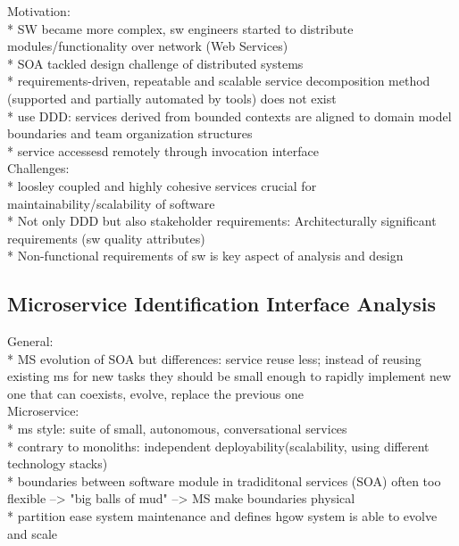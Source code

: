 Motivation: \\
* SW became more complex, sw engineers  started to distribute modules/functionality over network (Web Services)\\
* SOA tackled design challenge of distributed systems\\
* requirements-driven, repeatable and scalable service decomposition method (supported and partially automated by tools) does not exist\\
* use DDD: services derived from bounded contexts are aligned to domain model boundaries and team organization structures \\
* service accessesd remotely through invocation interface\\

Challenges:\\
* loosley coupled and highly cohesive services crucial for maintainability/scalability of software \\
* Not only DDD but also stakeholder requirements: Architecturally significant requirements (sw quality attributes) \\
* Non-functional requirements of sw is key aspect of analysis and design\\


\subsection{Microservice Identification Interface Analysis}
\cite{interfaceAnalysisBaresi}

General: \\
* MS evolution of SOA but differences: service reuse less; instead of reusing existing ms for new tasks they should be small enough to rapidly implement new one that can coexists, evolve, replace the previous one\\

Microservice:\\
* ms style: suite of small, autonomous, conversational services \\
* contrary to monoliths: independent deployability(scalability, using different technology stacks) \\
* boundaries between software module in tradiditonal services (SOA) often too flexible --> "big balls of mud" --> MS make boundaries physical\\
* partition ease system maintenance  and defines hgow system is able to evolve and scale \\



